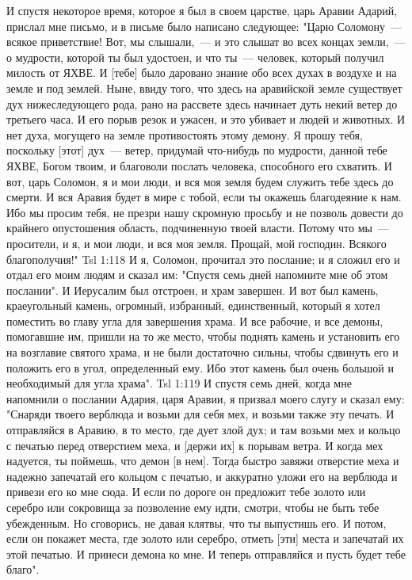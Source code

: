 И спустя некоторое время, которое я был в своем царстве, царь Аравии Адарий, прислал мне письмо, и в письме было написано следующее: "Царю Соломону~--- всякое приветствие! Вот, мы слышали,~--- и это слышат во всех концах земли,~--- о мудрости, которой ты был удостоен, и что ты~--- человек, который получил милость от ЯХВЕ. И [тебе] было даровано знание обо всех духах в воздухе и на земле и под землей. Ныне, ввиду того, что здесь на аравийской земле существует дух нижеследующего рода, рано на рассвете здесь начинает дуть некий ветер до третьего часа. И его порыв резок и ужасен, и это убивает и людей и животных. И нет духа, могущего на земле противостоять этому демону. Я прошу тебя, поскольку [этот] дух~--- ветер, придумай что-нибудь по мудрости, данной тебе ЯХВЕ, Богом твоим, и благоволи послать человека, способного его схватить. И вот, царь Соломон, я и мои люди, и вся моя земля будем служить тебе здесь до смерти. И вся Аравия будет в мире с тобой, если ты окажешь благодеяние к нам. Ибо мы просим тебя, не презри нашу скромную просьбу и не позволь довести до крайнего опустошения область, подчиненную твоей власти. Потому что мы~--- просители, и я, и мои люди, и вся моя земля. Прощай, мой господин. Всякого благополучия!"
\vs Tsl 1:118 
И я, Соломон, прочитал это послание; и я сложил его и отдал его моим людям и сказал им: "Спустя семь дней напомните мне об этом послании". И Иерусалим был отстроен, и храм завершен. И вот был камень, краеугольный камень, огромный, избранный, единственный, который я хотел поместить во главу угла для завершения храма. И все рабочие, и все демоны, помогавшие им, пришли на то же место, чтобы поднять камень и установить его на возглавие святого храма, и не были достаточно сильны, чтобы сдвинуть его и положить его в угол, определенный ему. Ибо этот камень был очень большой и необходимый для угла храма".
\vs Tsl 1:119 
И спустя семь дней, когда мне напомнили о послании Адария, царя Аравии, я призвал моего слугу и сказал ему: "Снаряди твоего верблюда и возьми для себя мех, и возьми также эту печать. И отправляйся в Аравию, в то место, где дует злой дух; и там возьми мех и кольцо с печатью перед отверстием меха, и [держи их] к порывам ветра. И когда мех надуется, ты поймешь, что демон [в нем]. Тогда быстро завяжи отверстие меха и надежно запечатай его кольцом с печатью, и аккуратно уложи его на верблюда и привези его ко мне сюда. И если по дороге он предложит тебе золото или серебро или сокровища за позволение ему идти, смотри, чтобы не быть тебе убежденным. Но сговорись, не давая клятвы, что ты выпустишь его. И потом, если он покажет места, где золото или серебро, отметь [эти] места и запечатай их этой печатью. И принеси демона ко мне. И теперь отправляйся и пусть будет тебе благо".
